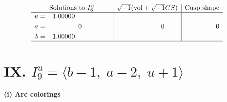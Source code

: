 \documentclass[1p]{elsarticle_modified}
\theoremstyle{definition}
\newcommand{\I}{\sqrt{-1}}
\begin{document}
$$\begin{array}{c|c|c}  
\text{Solutions to }I^u_{8}& \I (\text{vol} + \sqrt{-1}CS) & \text{Cusp shape}\\
 \hline 
\begin{aligned}
u &= \phantom{-}1.00000\phantom{ +0.000000I} \\
a &= \phantom{-0.000000 } 0 \\
b &= \phantom{-}1.00000\phantom{ +0.000000I}\end{aligned}
 & \phantom{-0.000000 } 0 & \phantom{-0.000000 } 0\\
 \hline 
 \end{array}$$\newpage\newpage\renewcommand{\arraystretch}{1}
\centering \section*{IX. $I^u_{9}= \langle b-1,\;a-2,\;u+1 \rangle$}
\flushleft \textbf{(i) Arc colorings}\\
\end{document}
